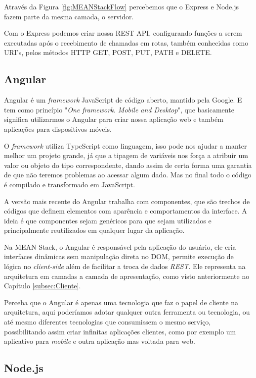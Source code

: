 \documentclass[
	12pt,				%
	openright,			%
	twoside,			%
	a4paper,			%
	english,			%
	brazil				%
	]{abntex2}
\begin{document}
Através da Figura \ref{fig:MEANStackFlow} percebemos que o Express e Node.js fazem parte da mesma camada, o servidor.

Com o Express podemos criar nossa REST API, configurando funções a serem executadas após o recebimento de chamadas em rotas, também conhecidas como URI's, pelos métodos HTTP GET, POST, PUT, PATH e DELETE.

\subsection{Angular}

Angular é um \textit{framework} JavaScript de código aberto, mantido pela Google. E tem como princípio "\textit{One framework. Mobile and Desktop}", que basicamente significa utilizarmos o Angular para criar nossa aplicação web e também aplicações para dispositivos móveis.

O \textit{framework} utiliza TypeScript como linguagem, isso pode nos ajudar a manter melhor um projeto grande, já que a tipagem de variáveis nos força a atribuir um valor ou objeto do tipo correspondente, dando assim de certa forma uma garantia de que não teremos problemas ao acessar algum dado. Mas no final todo o código é compilado e transformado em JavaScript.

A versão mais recente do Angular trabalha com componentes, que são trechos de códigos que definem elementos com aparência e comportamentos da interface. A ideia é que componentes sejam genéricos para que sejam utilizados e principalmente reutilizados em qualquer lugar da aplicação.

Na MEAN Stack, o Angular é responsável pela aplicação do usuário, ele cria interfaces dinâmicas sem manipulação direta no DOM, permite execução de lógica no \textit{client-side} além de facilitar a troca de dados \textit{REST}. Ele representa na arquitetura em camadas a camada de apresentação, como visto anteriormente no Capítulo \ref{subsec:Cliente}.

Perceba que o Angular é apenas uma tecnologia que faz o papel de cliente na arquitetura, aqui poderíamos adotar qualquer outra ferramenta ou tecnologia, ou até mesmo diferentes tecnologias que consumissem o mesmo serviço, possibilitando assim criar infinitas aplicações clientes, como por exemplo um aplicativo para \textit{mobile} e outra aplicação mas voltada para web.

\subsection{Node.js}
\end{document}
